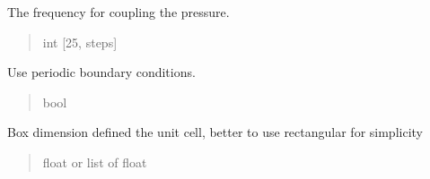 \documentclass[letterpaper,10pt,english]{sphinxmanual}
\begin{document}
\begin{fulllineitems}
\begin{fulllineitems}
\begin{quote}
\begin{description}
\end{description}\end{quote}

\end{fulllineitems}


\begin{fulllineitems}
\label{\detokenize{modules/dynamics:hps.dynamics.Dynamics.frequency_p}}
\pysigstartsignatures
{}
\pysigstopsignatures
\sphinxAtStartPar
The frequency for coupling the pressure.
\begin{quote}\begin{description}
\sphinxAtStartPar
int {[}25, steps{]}

\end{description}\end{quote}

\end{fulllineitems}


\begin{fulllineitems}
\label{\detokenize{modules/dynamics:hps.dynamics.Dynamics.pbc}}
\pysigstartsignatures
{}
\pysigstopsignatures
\sphinxAtStartPar
Use periodic boundary conditions.
\begin{quote}\begin{description}
\sphinxAtStartPar
bool

\end{description}\end{quote}

\end{fulllineitems}


\begin{fulllineitems}
\label{\detokenize{modules/dynamics:hps.dynamics.Dynamics.box_dimension}}
\pysigstartsignatures
{}
\pysigstopsignatures
\sphinxAtStartPar
Box dimension defined the unit cell, better to use rectangular for simplicity
\begin{quote}\begin{description}
\sphinxAtStartPar
float or list of float


\end{description}
\end{quote}
\end{fulllineitems}
\end{fulllineitems}
\end{document}

